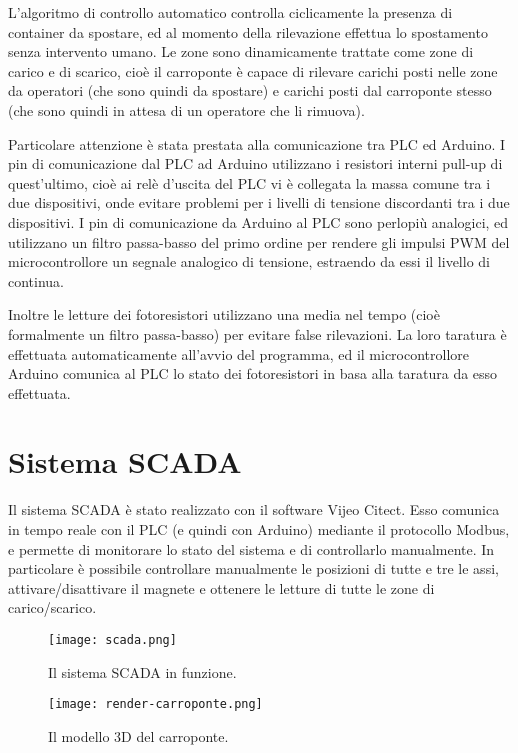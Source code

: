 L'algoritmo di controllo automatico controlla ciclicamente la presenza di container da spostare, ed
al momento della rilevazione effettua lo spostamento senza intervento umano. Le zone sono
dinamicamente trattate come zone di carico e di scarico, cioè il carroponte è capace di rilevare
carichi posti nelle zone da operatori (che sono quindi da spostare) e carichi posti dal carroponte
stesso (che sono quindi in attesa di un operatore che li rimuova).

Particolare attenzione è stata prestata alla comunicazione tra PLC ed Arduino. I pin di
comunicazione dal PLC ad Arduino utilizzano i resistori interni pull-up di quest'ultimo, cioè ai
relè d'uscita del PLC vi è collegata la massa comune tra i due dispositivi, onde evitare problemi
per i livelli di tensione discordanti tra i due dispositivi. I pin di comunicazione da Arduino al
PLC sono perlopiù analogici, ed utilizzano un filtro passa-basso del primo ordine per rendere gli
impulsi PWM del microcontrollore un segnale analogico di tensione, estraendo da essi il livello di
continua.

Inoltre le letture dei fotoresistori utilizzano una media nel tempo (cioè formalmente un filtro
passa-basso) per evitare false rilevazioni. La loro taratura è effettuata automaticamente all'avvio
del programma, ed il microcontrollore Arduino comunica al PLC lo stato dei fotoresistori in basa
alla taratura da esso effettuata.

\section{Sistema SCADA}

Il sistema SCADA è stato realizzato con il software Vijeo Citect. Esso comunica in tempo reale con
il PLC (e quindi con Arduino) mediante il protocollo Modbus, e permette di monitorare lo stato del
sistema e di controllarlo manualmente. In particolare è possibile controllare manualmente le
posizioni di tutte e tre le assi, attivare/disattivare il magnete e ottenere le letture di tutte le
zone di carico/scarico.

\begin{figure}[htbp]\centering
    \caption{Il sistema SCADA in funzione.}
    \texttt{[image: scada.png]}
\end{figure}

\begin{figure}[htbp]\centering
    \caption{Il modello 3D del carroponte.}
    \texttt{[image: render-carroponte.png]}
\end{figure}


